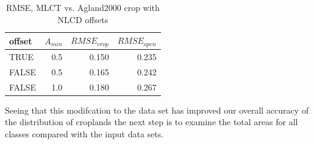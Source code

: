 \begin{table}[ht]
\begin{center}
\begin{tabular}{lrrr}
  \hline
offset & $A_{min}$ & $RMSE_{crop}$ & $RMSE_{open}$ \\ 
  \hline
TRUE & 0.5 & 0.150 & 0.235 \\ 
  FALSE & 0.5 & 0.165 & 0.242 \\ 
  FALSE & 1.0 & 0.180 & 0.267 \\ 
   \hline
\end{tabular}
\caption{RMSE, MLCT vs. Agland2000 crop with NLCD offsets}
\label{tab:rmse2}
\end{center}
\end{table}

Seeing that this modifcation to the data set has improved our overall
accuracy of the distribution of croplands the next step is to examine
the total areas for all classes compared with the input data sets.  


